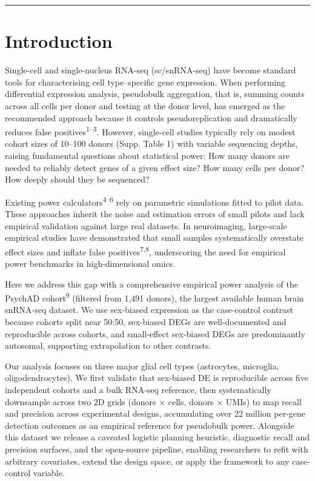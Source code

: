 \documentclass[
]{article}
\begin{document}
\begin{center}\rule{0.5\linewidth}{0.5pt}\end{center}

\section{Introduction}\label{introduction}

Single-cell and single-nucleus RNA-seq (sc/snRNA-seq) have become
standard tools for characterising cell type--specific gene expression.
When performing differential expression analysis, pseudobulk
aggregation, that is, summing counts across all cells per donor and
testing at the donor level, has emerged as the recommended approach
because it controls pseudoreplication and dramatically reduces false
positives\textsuperscript{1--3}. However, single-cell studies typically
rely on modest cohort sizes of 10--100 donors (Supp. Table 1) with
variable sequencing depths, raising fundamental questions about
statistical power: How many donors are needed to reliably detect genes
of a given effect size? How many cells per donor? How deeply should they
be sequenced?

Existing power calculators\textsuperscript{4--6} rely on parametric
simulations fitted to pilot data. These approaches inherit the noise and
estimation errors of small pilots and lack empirical validation against
large real datasets. In neuroimaging, large-scale empirical studies have
demonstrated that small samples systematically overstate effect sizes
and inflate false positives\textsuperscript{7,8}, underscoring the need
for empirical power benchmarks in high-dimensional omics.

Here we address this gap with a comprehensive empirical power analysis
of the PsychAD cohort\textsuperscript{9} (filtered from 1,491 donors),
the largest available human brain snRNA-seq dataset. We use sex-biased
expression as the case-control contrast because cohorts split near
50:50, sex-biased DEGs are well-documented and reproducible across
cohorts, and small-effect sex-biased DEGs are predominantly autosomal,
supporting extrapolation to other contrasts.

Our analysis focuses on three major glial cell types (astrocytes,
microglia, oligodendrocytes). We first validate that sex-biased DE is
reproducible across five independent cohorts and a bulk RNA-seq
reference, then systematically downsample across two 2D grids (donors ×
cells, donors × UMIs) to map recall and precision across experimental
designs, accumulating over 22 million per-gene detection outcomes as an
empirical reference for pseudobulk power. Alongside this dataset we
release a caveated logistic planning heuristic, diagnostic recall and
precision surfaces, and the open-source pipeline, enabling researchers
to refit with arbitrary covariates, extend the design space, or apply
the framework to any case-control variable.
\end{document}
